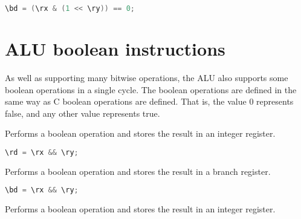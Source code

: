 \begin{lstlisting}[numbers=none, basicstyle=\ttfamily\footnotesize, language=C++]
\bd = (\rx & (1 << \ry)) == 0;
\end{lstlisting}

\section{ALU boolean instructions}


As well as supporting many bitwise operations, the \rvex{} ALU also supports
some boolean operations in a single cycle. The boolean operations are defined in
the same way as C boolean operations are defined. That is, the value 0
represents false, and any other value represents true.

Performs a boolean  operation and stores the result in an integer
register.

\begin{lstlisting}[numbers=none, basicstyle=\ttfamily\footnotesize, language=C++]
\rd = \rx && \ry;
\end{lstlisting}

Performs a boolean  operation and stores the result in a branch
register.

\begin{lstlisting}[numbers=none, basicstyle=\ttfamily\footnotesize, language=C++]
\bd = \rx && \ry;
\end{lstlisting}

Performs a boolean  operation and stores the result in an integer
register.

